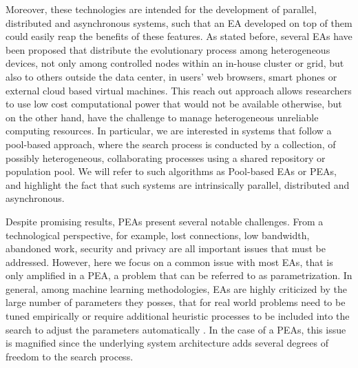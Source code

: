 \documentclass{sig-alternate}
\begin{document}
Moreover, these technologies are intended for the development of parallel, distributed and asynchronous systems,
such that an EA developed on top of them could easily reap the benefits of these features.
As stated before, several EAs have been proposed that distribute  the evolutionary process among heterogeneous devices, not only among controlled
nodes within an in-house cluster or grid, but also to others outside the data center, in users' web browsers, smart phones or external cloud based virtual machines.
This reach out approach allows researchers to use low cost computational 
power that would not be available otherwise, but on the other hand, have the 
challenge to manage heterogeneous unreliable computing resources. 
In particular, we are interested in systems that follow a pool-based approach, where the search process is conducted
by a collection, of possibly heterogeneous, collaborating processes using a shared repository or population pool.
We will refer to such algorithms as Pool-based EAs or PEAs, and highlight the fact that such systems are
intrinsically parallel, distributed and asynchronous.

Despite promising results, PEAs present several notable challenges. From a technological perspective, for example, lost 
connections, low bandwidth, abandoned work, security and privacy are all important issues that must be addressed. 
However, here we focus on a common issue with most EAs, that is only amplified in a PEA, a problem that can be referred to as parametrization.
In general, among machine learning methodologies, EAs are highly criticized by the large number of parameters they posses,
that for real world problems need to be tuned empirically or require additional heuristic processes to be included into the search to
adjust the parameters automatically \cite{ss}.
In the case of a PEAs, this issue is magnified since the underlying system architecture adds several degrees of freedom to the search process.
\end{document}
